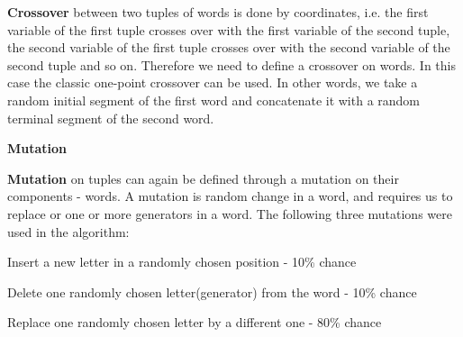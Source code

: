 \documentclass[12pt]{slides}
\begin{document}
{\bf Crossover} between two tuples of words is done by coordinates,
i.e. the first variable of the first tuple crosses over with the first
variable of the second tuple, the second variable of the first tuple
crosses over with the second variable of the second tuple and so
on. Therefore we need to define a crossover on words. In this case the
classic one-point crossover can be used. In other words, we take a
random initial segment of the first word and concatenate it with a
random terminal segment of the second word.

\newpage

\begin{center} \Large\textbf{Mutation} \end{center}
\vspace{5mm}

{\bf Mutation} on tuples can again be defined through a mutation on
their components - words. A mutation is random change in a word, and
requires us to replace or one or more generators in a word. The
following three mutations were used in the algorithm:

Insert a new letter in a randomly chosen position - 10\% chance

Delete one randomly chosen letter(generator) from the word -  10\% chance

Replace one randomly chosen letter by a different one -  80\% chance
\vspace{3mm}
\end{document}
